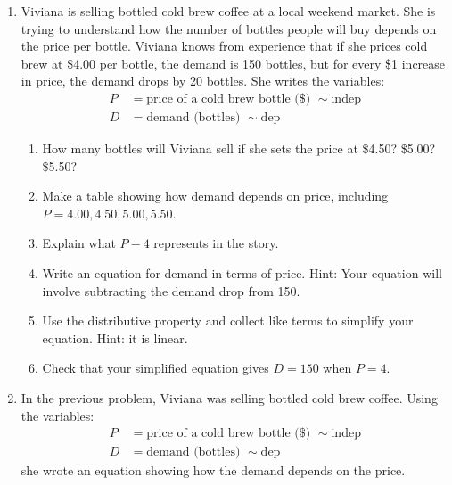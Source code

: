 \begin{enumerate}
\begin{enumerate}
    \item Use FOIL and collecting like terms to simplify your answer to (c). It should fit the quadratic equation template.
    
    \item What is the area if $W=0$?  Explain what that means in terms of the story.
\end{enumerate}

\item Viviana is selling bottled cold brew coffee at a local weekend market. She is trying to understand how the number of bottles people will buy depends on the price per bottle. Viviana knows from experience that if she prices cold brew at \$4.00 per bottle, the demand is 150 bottles, but for every \$1 increase in price, the demand drops by 20 bottles. She writes the variables:
\begin{align*}
P &= \text{price of a cold brew bottle (\$) } \sim \text{indep} \\
D &= \text{demand (bottles) } \sim \text{dep}
\end{align*}

\begin{enumerate}
    \item How many bottles will Viviana sell if she sets the price at \$4.50? \$5.00? \$5.50?
    \item Make a table showing how demand depends on price, including $P = 4.00, 4.50, 5.00, 5.50$.
    \item Explain what $P-4$ represents in the story.
    \item Write an equation for demand in terms of price. Hint: Your equation will involve subtracting the demand drop from 150.
    \item Use the distributive property and collect like terms to simplify your equation. Hint: it is linear.
    \item Check that your simplified equation gives $D = 150$ when $P = 4$.
\end{enumerate}

\item In the previous problem, Viviana was selling bottled cold brew coffee. Using the variables:
\begin{align*}
P &= \text{price of a cold brew bottle (\$) } \sim \text{indep} \\
D &= \text{demand (bottles) } \sim \text{dep}
\end{align*}
she wrote an equation showing how the demand depends on the price.


\end{enumerate}

